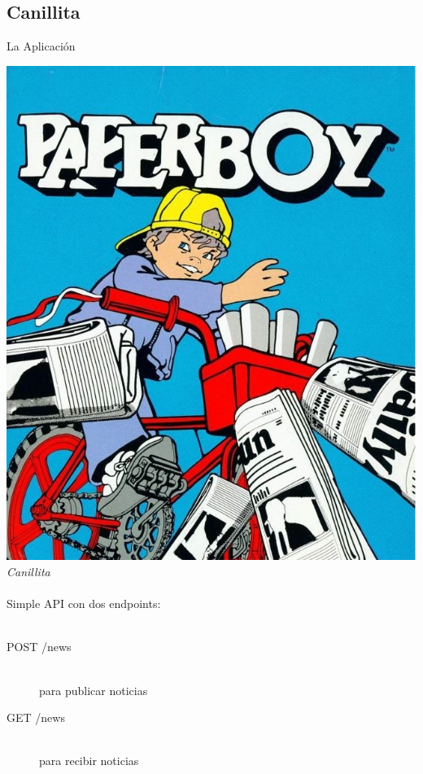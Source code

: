 \documentclass[utf8,hyperref={colorlinks=true}]{beamer}
\begin{document}
\subsection{Canillita}
\begin{frame}{La Aplicaci\'on}
\begin{multicols}{2}
\includegraphics[height=.8\textheight]{img/paperboy.jpg} \\
\columnbreak
	\alert{\textit{{\huge Canillita}}}
	\ \\
	\ \\
	Simple API con dos endpoints:
	\ \\
	\ \\
		\begin{description}
			\item[POST /news]\ \\ para publicar noticias
			\item[GET /news]\ \\ para recibir noticias
		\end{description}
\end{multicols}
\end{frame}
\end{document}
